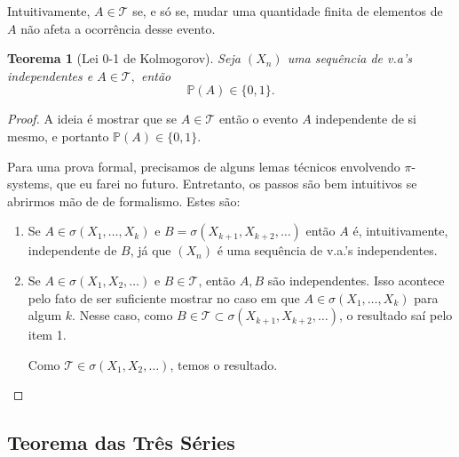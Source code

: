 \documentclass[12pt,a4paper,oneside]{book}
\newtheorem{theorem}{Teorema}[section]
\theoremstyle{definition}
\theoremstyle{remark}
\numberwithin{equation}{section}
\newcommand{\pr}{\mathbb{P}}
\begin{document}
\begin{tcolorbox}[colback = yellow!60]

Intuitivamente, $A\in \mathcal{T}$ se, e só se, mudar uma quantidade finita de elementos de $A$ não afeta a ocorrência desse evento.

\end{tcolorbox}





\begin{theorem}[Lei 0-1 de Kolmogorov]  \label{teo-lei0-1} Seja $(X_n)$ uma sequência de v.a's independentes e $A\in \mathcal{T},$ então 
$$\pr(A) \in \{0,1\}.$$

\end{theorem}
\begin{proof}
A ideia é mostrar que se $A\in \mathcal{T}$ então o evento $A$ independente de si mesmo, e portanto $\pr(A)\in \{0,1\}$.

Para uma prova formal, precisamos de alguns lemas técnicos envolvendo $\pi$-systems, que eu farei no futuro. Entretanto, os passos são bem intuitivos se abrirmos mão de de formalismo. Estes são:
\begin{enumerate}
\item Se $A\in \sigma(X_1,\dots,X_k)$ e $B= \sigma(X_{k+1},X_{k+2},\dots)$ então $A$ é, intuitivamente, independente de $B$, já que $(X_n)$ é uma sequência de v.a.'s independentes.
\item Se $A\in \sigma(X_1,X_2,\dots)$ e $B\in \mathcal{T}$, então $A, B$ são independentes. Isso acontece pelo fato de ser suficiente mostrar no caso em que $A\in \sigma(X_1,\dots,X_k)$ para algum $k$. Nesse caso, como $B\in \mathcal{T}\subset \sigma(X_{k+1},X_{k+2},\dots)$, o resultado saí pelo item 1.  

Como $\mathcal{T}\in \sigma(X_1,X_2,\dots)$, temos o resultado.
\end{enumerate}
\end{proof}



\subsection{Teorema das Três Séries}
\end{document}
